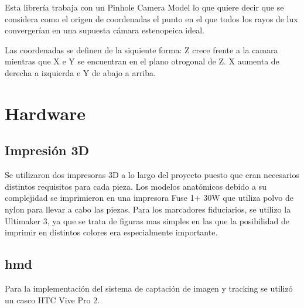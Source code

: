 Esta librería trabaja con un Pinhole Camera Model lo que quiere decir que se considera como el origen de coordenadas el punto en el que todos los rayos de lux convergerían en una supuesta cámara estenopeica ideal.

Las coordenadas se definen de la siquiente forma: Z crece frente a la camara mientras que X e Y se encuentran en el plano otrogonal de Z. X aumenta de derecha a izquierda e Y de abajo a arriba.







\section{Hardware}
\subsection{Impresión 3D}
Se utilizaron dos impresoras 3D a lo largo del proyecto puesto que eran necesarios distintos requisitos para cada pieza.
Los modelos anatómicos debido a su complejidad se imprimieron en una impresora Fuse 1+ 30W que utiliza polvo de nylon para llevar a cabo las piezas.
Para los marcadores fiduciarios, se utilizo la Ultimaker 3, ya que se trata de figuras mas simples en las que la posibilidad de imprimir en distintos colores era especialmente importante.
\subsection{\acrfull{hmd}}
Para la implementación del sistema de captación de imagen y tracking se utilizó un casco HTC Vive Pro 2.


